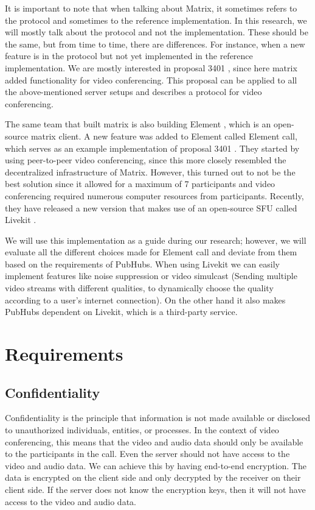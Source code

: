 \documentclass{report}
\begin{document}
It is important to note that when talking about Matrix, it sometimes refers to the protocol and sometimes to the
reference implementation. In this research, we will mostly talk about the protocol and not the implementation. These
should be the same, but from time to time, there are differences. For instance, when a new feature is in the protocol
but not yet implemented in the reference implementation. We are mostly interested in proposal 3401 \cite{
noauthor_matrix-spec-proposalsproposals3401-group-voipmd_nodate}, since here matrix added functionality for video conferencing. This proposal
can be applied to all the above-mentioned server setups and describes a protocol for video conferencing.

The same team that built matrix is also building Element \cite{noauthor_element_nodate}, which is an open-source matrix client.
A new feature was added to Element called Element call, which serves as an example implementation of proposal
3401 \cite{noauthor_matrix-spec-proposalsproposals3401-group-voipmd_nodate}. They started by using peer-to-peer
video conferencing, since this more closely resembled the decentralized infrastructure of Matrix. However, this
turned out to not be the best solution since it allowed for a  maximum of 7 participants and video conferencing
required numerous computer  resources from participants. Recently, they have released a new version that makes use
of an open-source SFU called Livekit \cite{noauthor_livekit_nodate}.

We will use this implementation as a guide during our research; however, we will evaluate all the different choices
made for Element call and deviate from them based on the requirements of PubHubs. When using Livekit we can easily
implement features like noise suppression or video simulcast (Sending multiple video streams with different
qualities, to dynamically choose the quality according to a user's internet connection). On the other hand it
also makes PubHubs dependent on Livekit, which is a third-party service.


\chapter{Requirements}

\section{Confidentiality}
Confidentiality is the principle that information is not made available or disclosed to unauthorized individuals,
entities, or processes. In the context of video conferencing, this means that the video and audio data should only
be available to the participants in the call. Even the server should not have access to the video and audio data. We
can achieve this by having end-to-end encryption. The data is encrypted on the client side and only decrypted by
the receiver on their client side. If the server does not know the encryption keys, then it will not have access to
the video and audio data.
\end{document}
